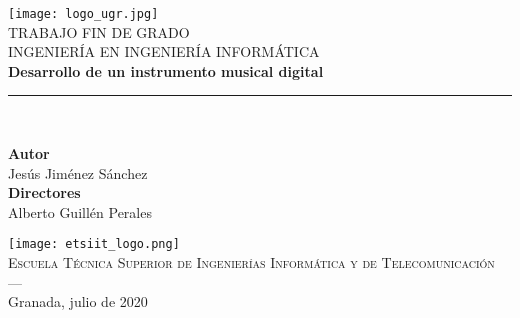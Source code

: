 
\begin{titlepage}

    \newlength{\centeroffset}
    \setlength{\centeroffset}{-0.5\oddsidemargin}
    \addtolength{\centeroffset}{0.5\evensidemargin}
    \thispagestyle{empty}

    \noindent\hspace*{\centeroffset}

    \begin{minipage}{\textwidth}

        \centering
        \texttt{[image: logo\_ugr.jpg]}\\[1.4cm]

        \textsc{ \Large TRABAJO FIN DE GRADO\\[0.2cm]}
        \textsc{ INGENIERÍA EN INGENIERÍA INFORMÁTICA}\\[1cm]
        {\Huge\bfseries Desarrollo de un instrumento musical digital\\
        }
        \noindent\rule[-1ex]{\textwidth}{3pt}\\[3.5ex]

    \end{minipage}

    \vspace{2.5cm}
    \noindent\hspace*{\centeroffset}

    \begin{minipage}{\textwidth}

        \centering

        \textbf{Autor}\\
        { Jesús Jiménez Sánchez }\\
        [2.5ex]
        \textbf{Directores}\\
        { Alberto Guillén Perales\\
        [2cm] }

        \texttt{[image: etsiit\_logo.png]}\\
        [0.1cm]
        \textsc{Escuela Técnica Superior de Ingenierías Informática y de Telecomunicación}\\
        \textsc{---}\\
        Granada, julio de 2020

    \end{minipage}

\end{titlepage}
